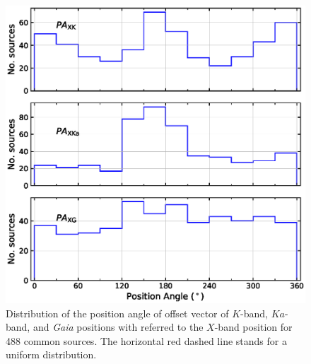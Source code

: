 \documentclass{aa}
\begin{document}

    \begin{figure}[hbtp]
        \centering
        \includegraphics[width=\columnwidth]{figs/pa-hist}
        \caption[]{\label{fig:pa-hist}
            Distribution of the position angle of offset vector of $K$-band, $Ka$-band, and \textit{Gaia} positions with referred to the $X$-band position for 488 common sources.
            The horizontal red dashed line stands for a uniform distribution.
        }
    \end{figure}

\end{document}

